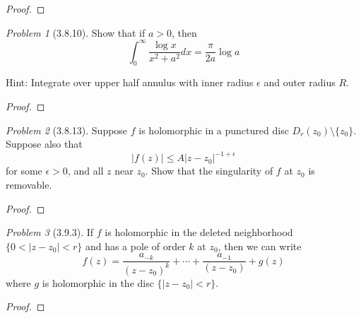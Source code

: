 \documentclass[10pt]{article}
\newcommand{\sk}{\vskip 10mm}
\theoremstyle{remark}
\newtheorem{problem}{Problem}
\theoremstyle{remark}
\begin{document}
\begin{proof}
  
\end{proof}

\sk

\begin{problem}[3.8.10]
  Show that if $a>0$, then
  \[
    \int_0^\infty\frac{\log x}{x^2+a^2}dx=\frac{\pi}{2a}\log a
  \]

  Hint: Integrate over upper half annulus with inner radius $\epsilon$ and outer
  radius $R$.
\end{problem}

\begin{proof}
  
\end{proof}

\sk

\begin{problem}[3.8.13]
  Suppose $f$ is holomorphic in a punctured disc $D_r(z_0)\setminus\{z_0\}$.
  Suppose also that
  \[
    |f(z)|\leq A|z-z_0|^{-1+\epsilon}
  \]
  for some $\epsilon>0$, and all $z$ near $z_0$. Show that the singularity
  of $f$ at $z_0$ is removable.
\end{problem}

\begin{proof}
  
\end{proof}

\sk

\begin{problem}[3.9.3]
  If $f$ is holomorphic in the deleted neighborhood $\{0<|z-z_0|<r\}$ and has a
  pole of order $k$ at $z_0$, then we can write
  \[
    f(z)=\frac{a_{-k}}{(z-z_0)^k}+\cdots + \frac{a_{-1}}{(z-z_0)} +g(z)
  \]
  where $g$ is holomorphic in the disc $\{|z-z_0|<r\}$.
\end{problem}

\begin{proof}
  
\end{proof}

\end{document}
